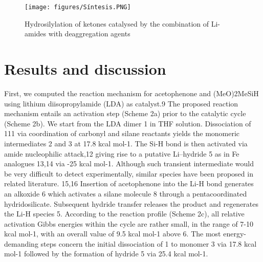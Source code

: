 \documentclass[journal=jacsat,manuscript=article]{achemso}
\begin{document}
	\renewcommand{\figurename}{Scheme}
	
	\begin{figure}[h]
		\texttt{[image: figures/Síntesis.PNG]}
		\centering
		\caption{Hydrosilylation of ketones catalysed by the combination of	Li-amides with deaggregation agents}
		\centering
		\label{Scheme1}
	\end{figure}	
	
	
	\section{Results and discussion}
	First, we computed the reaction mechanism for acetophenone and (MeO)2MeSiH using lithium diisopropylamide (LDA) as catalyst.9 The proposed reaction mechanism entails an activation step (Scheme 2a) prior to the catalytic cycle (Scheme 2b). We start from the LDA dimer 1 in THF solution. Dissociation of 111 via coordination of carbonyl and silane reactants yields the monomeric intermediates 2 and 3 at 17.8 kcal mol-1. The Si-H bond is then activated via amide nucleophilic attack,12 giving rise to a putative Li–hydride 5 as in Fe analogues 13,14 via -25 kcal mol-1. Although such transient intermediate would be very difficult to detect experimentally, similar species have been proposed in related literature. 15,16 Insertion of acetophenone into the Li-H bond generates an alkoxide 6 which activates a silane molecule 8 through a pentacoordinated hydridosilicate. Subsequent	hydride transfer releases the product and regenerates the Li-H species 5. According to the reaction profile (Scheme 2c), all relative activation Gibbs energies within the cycle are rather small, in the range of 7-10 kcal mol-1, with an overall value of 9.5 kcal mol-1 above 6. The most energy-demanding steps concern the initial dissociation of 1 to monomer 3 via 17.8 kcal mol-1 followed by the formation of hydride 5 via 25.4 kcal mol-1.
	
\end{document}
